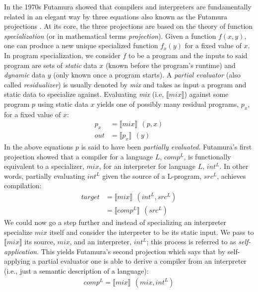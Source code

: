 \documentclass[a4paper,12pt,twoside,openright]{report}
\theoremstyle{definition}
\begin{document}

In the 1970s Futamura showed that compilers and interpreters are fundamentally related in  an elegant way by three equations also known as the Futamura projections \cite{futamura1999partial}. At its core, the three projections are based on the theory of function \textit{specialization} (or in mathematical terms \textit{projection}). Given a function $f(x,y)$, one can produce a new unique specialized function $f_{x}(y)$ for a fixed value of $x$. In program specialization, we consider $f$ to be a program and the inputs to said program are sets of \textit{static} data $x$ (known before the program's runtime) and \textit{dynamic} data $y$ (only known once a program starts). A \textit{partial evaluator} (also called \textit{residualizer}) is usually denoted by \textit{mix} and takes as input a program and static data to specialize against. Evaluating \textit{mix} (i.e, $\llbracket \mathit{mix} \rrbracket$) against some program $p$ using static data $x$ yields one of possibly many residual programs, $p_x$, for a fixed value of $x$:
\begin{align*}
    p_{x} & = \llbracket mix \rrbracket \:\: (p, x) \\
    out & = \llbracket p_{x} \rrbracket \:\: (y)
\end{align*}
In the above equations $p$ is said to have been \textit{partially evaluated}. Futamura's first projection showed that a compiler for a language $L$, $comp^{L}$, is functionally equivalent to a specializer, $mix$, for an interpreter for language $L$, $int^{L}$. In other words, partially evaluating $int^{L}$ given the source of a L-program, $src^{L}$, achieves compilation:
\begin{align*}
    target & = \llbracket mix \rrbracket \:\: (int^{L}, src^{L}) \\
           & = \llbracket comp^{L} \rrbracket \:\: (src^{L})
\end{align*}
We could now go a step further and instead of specializing an interpreter specialize $mix$ itself and consider the interpreter to be its static input. We pass to $\llbracket \mathit{mix} \rrbracket$ its source, $mix$, and an interpreter, $int^L$; this process is referred to as \textit{self-application}. This yields Futamura's second projection which says that by self-applying a partial evaluator one is able to derive a compiler from an interpreter (i.e., just a semantic description of a language):
\begin{align*}
    comp^{L} = \llbracket mix \rrbracket \:\: (mix, int^{L})
\end{align*}
\end{document}
